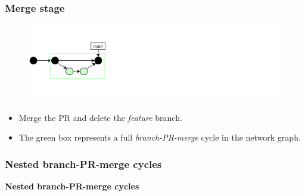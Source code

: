 \documentclass[aspectratio=169]{beamer}
\begin{document}
\begin{frame}
	\frametitle{Merge stage}

	\vspace{-.5cm}
	\begin{minipage}[t][5cm][t]{\textwidth}
		\begin{figure}
			\centering
			\includegraphics[width=\textwidth]{./img/dime-gitflow-network-1-3.png}
		\end{figure}
	\end{minipage}

	\vspace{-.5cm}
	\begin{minipage}[t][5cm][t]{\textwidth}
		\begin{itemize}
			\setlength\itemsep{.5em}
			\item Merge the PR and delete the \textit{feature} branch.
			\item The green box represents
			a full \textit{branch-PR-merge} cycle in the network graph.
		\end{itemize}
	\end{minipage}

\end{frame}

\begin{frame}
	\frametitle{Nested branch-PR-merge cycles}

	\huge\centering \textbf{Nested branch-PR-merge cycles}

\end{frame}
\end{document}

